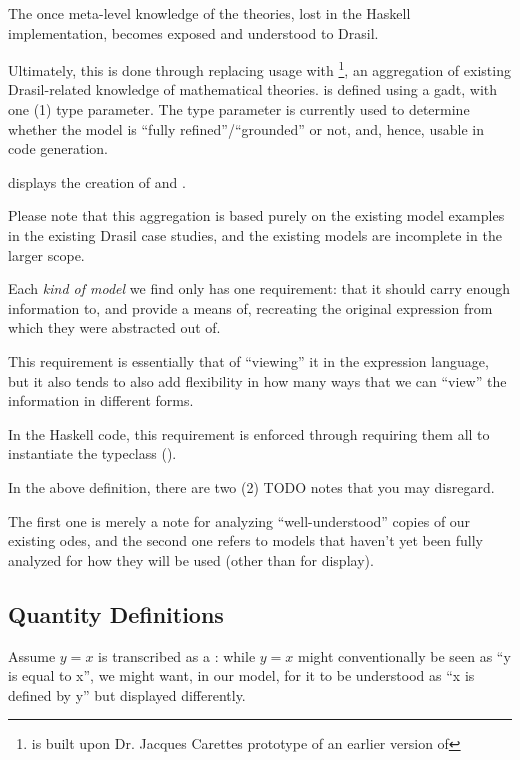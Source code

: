 The once meta-level knowledge of the theories, lost in the Haskell
implementation, becomes exposed and understood to Drasil.

Ultimately, this is done through replacing \RelationConcept{} usage with
\ModelKind{}\footnote{\ModelKind{} is built upon Dr. Jacques Carettes prototype
of an earlier version of \ModelKinds{}}, an aggregation of existing
Drasil-related knowledge of mathematical theories. \ModelKind{} is defined using
a \acs{gadt}, with one (1) type parameter. The type parameter is currently used
to determine whether the model is ``fully refined''/``grounded'' or not, and,
hence, usable in code generation.

 displays the creation of \ModelKind{} and
\ModelKinds{}.

Please note that this aggregation is based purely on the existing model examples
in the existing Drasil case studies, and the existing models are incomplete in
the larger scope.

Each \textit{kind of model} we find only has one requirement: that it should
carry enough information to, and provide a means of, recreating the original
expression from which they were abstracted out of.

This requirement is essentially that of ``viewing'' it in the expression
language, but it also tends to also add flexibility in how many ways that we can
``view'' the information in different forms.

In the Haskell code, this requirement is enforced through requiring them all to
instantiate the \Express{} typeclass ().

\currentModelKindsHaskell{}

In the above \ModelKinds{} definition, there are two (2) TODO notes that you may
disregard.

The first one is merely a note for analyzing ``well-understood'' copies of our
existing \acsp{ode}, and the second one refers to models that haven't yet been
fully analyzed for how they will be used (other than for display).

\subsection{Quantity Definitions}

\currentQDefinitionHaskell{}

Assume \(y = x\) is transcribed as a \RelationConcept{}: while \(y = x\) might
conventionally be seen as ``y is equal to x'', we might want, in our model, for
it to be understood as ``x is defined by y'' but displayed differently.

